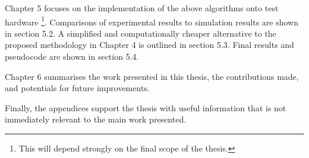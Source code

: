 		Chapter {\color{BurntOrange} 5} focuses on the implementation of the above algorithms onto test hardware \footnote{ {\color{BurntOrange} This will depend strongly on the final scope of the thesis.} }. Comparisons of experimental results to simulation results are shown in section {\color{BurntOrange} 5.2}. A simplified and computationally cheaper alternative to the proposed methodology in Chapter {\color{BurntOrange} 4} is outlined in section {\color{BurntOrange} 5.3}. Final results and pseudocode are shown in section {\color{BurntOrange} 5.4}.
		
		Chapter {\color{BurntOrange} 6} summarises the work presented in this thesis, the contributions made, and potentials for future improvements.
		
		Finally, the appendices support the thesis with useful information that is not immediately relevant to the main work presented.
		
		